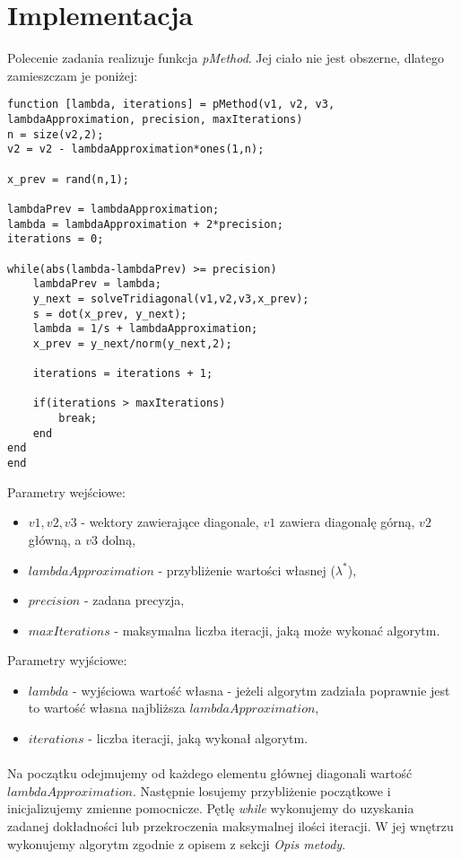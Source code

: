 \documentclass{article}
\begin{document}
\section{Implementacja}
Polecenie zadania realizuje funkcja \textit{pMethod}. Jej ciało nie jest obszerne, dlatego zamieszczam je poniżej:
\begin{lstlisting}[style=Matlab-editor]
function [lambda, iterations] = pMethod(v1, v2, v3, lambdaApproximation, precision, maxIterations)
n = size(v2,2);
v2 = v2 - lambdaApproximation*ones(1,n);

x_prev = rand(n,1);

lambdaPrev = lambdaApproximation;
lambda = lambdaApproximation + 2*precision; 
iterations = 0;

while(abs(lambda-lambdaPrev) >= precision)
    lambdaPrev = lambda;
    y_next = solveTridiagonal(v1,v2,v3,x_prev);
    s = dot(x_prev, y_next);
    lambda = 1/s + lambdaApproximation;
    x_prev = y_next/norm(y_next,2);
    
    iterations = iterations + 1;
    
    if(iterations > maxIterations)
        break;
    end
end
end
\end{lstlisting}
\vspace{4pt}
Parametry wejściowe:
\begin{itemize}
\item $v1, v2, v3$ - wektory zawierające diagonale, $v1$ zawiera diagonalę górną, $v2$ główną, a $v3$ dolną,
\item $lambdaApproximation$ - przybliżenie wartości własnej ($\lambda^*$),
\item $precision$ - zadana precyzja,
\item $maxIterations$ - maksymalna liczba iteracji, jaką może wykonać algorytm.
\end{itemize}
Parametry wyjściowe:
\begin{itemize}
\item $lambda$ - wyjściowa wartość własna - jeżeli algorytm zadziała poprawnie jest to wartość własna najbliższa $lambdaApproximation$,
\item $iterations$ - liczba iteracji, jaką wykonał algorytm.
\end{itemize}
\paragraph{}
Na początku odejmujemy od każdego elementu głównej diagonali wartość $lambdaApproximation$. Następnie losujemy przybliżenie początkowe i inicjalizujemy zmienne pomocnicze. Pętlę \textit{while} wykonujemy do uzyskania zadanej dokładności lub przekroczenia maksymalnej ilości iteracji. W jej wnętrzu wykonujemy algorytm zgodnie z opisem z sekcji \textit{Opis metody}.
\end{document}
